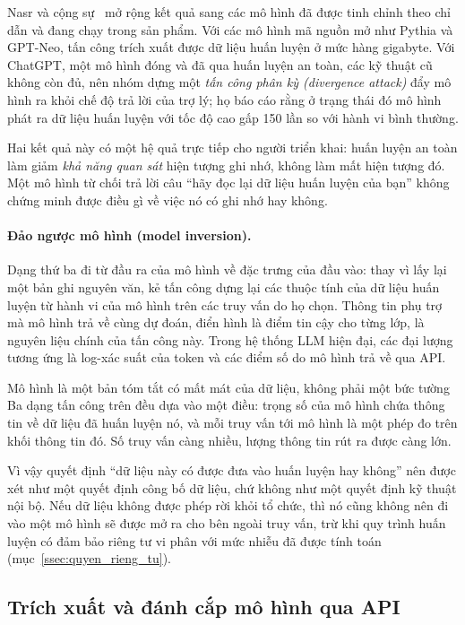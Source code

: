 Nasr và cộng sự~\cite{nasr2023scalable} mở rộng kết quả sang các mô hình đã được tinh chỉnh theo chỉ dẫn và đang chạy trong sản phẩm. Với các mô hình mã nguồn mở như Pythia và GPT-Neo, tấn công trích xuất được dữ liệu huấn luyện ở mức hàng gigabyte. Với ChatGPT, một mô hình đóng và đã qua huấn luyện an toàn, các kỹ thuật cũ không còn đủ, nên nhóm dựng một \emph{tấn công phân kỳ (divergence attack)} đẩy mô hình ra khỏi chế độ trả lời của trợ lý; họ báo cáo rằng ở trạng thái đó mô hình phát ra dữ liệu huấn luyện với tốc độ cao gấp 150 lần so với hành vi bình thường.

Hai kết quả này có một hệ quả trực tiếp cho người triển khai: huấn luyện an toàn làm giảm \emph{khả năng quan sát} hiện tượng ghi nhớ, không làm mất hiện tượng đó. Một mô hình từ chối trả lời câu ``hãy đọc lại dữ liệu huấn luyện của bạn'' không chứng minh được điều gì về việc nó có ghi nhớ hay không.

\paragraph{Đảo ngược mô hình (model inversion).} Dạng thứ ba đi từ đầu ra của mô hình về đặc trưng của đầu vào: thay vì lấy lại một bản ghi nguyên văn, kẻ tấn công dựng lại các thuộc tính của dữ liệu huấn luyện từ hành vi của mô hình trên các truy vấn do họ chọn. Thông tin phụ trợ mà mô hình trả về cùng dự đoán, điển hình là điểm tin cậy cho từng lớp, là nguyên liệu chính của tấn công này. Trong hệ thống LLM hiện đại, các đại lượng tương ứng là log-xác suất của token và các điểm số do mô hình trả về qua API.

\begin{keyidea}{Mô hình là một bản tóm tắt có mất mát của dữ liệu, không phải một bức tường}
Ba dạng tấn công trên đều dựa vào một điều: trọng số của mô hình chứa thông tin về dữ liệu đã huấn luyện nó, và mỗi truy vấn tới mô hình là một phép đo trên khối thông tin đó. Số truy vấn càng nhiều, lượng thông tin rút ra được càng lớn.

Vì vậy quyết định ``dữ liệu này có được đưa vào huấn luyện hay không'' nên được xét như một quyết định công bố dữ liệu, chứ không như một quyết định kỹ thuật nội bộ. Nếu dữ liệu không được phép rời khỏi tổ chức, thì nó cũng không nên đi vào một mô hình sẽ được mở ra cho bên ngoài truy vấn, trừ khi quy trình huấn luyện có đảm bảo riêng tư vi phân với mức nhiễu đã được tính toán (mục~\ref{ssec:quyen_rieng_tu}).
\end{keyidea}

\subsection{Trích xuất và đánh cắp mô hình qua API}
\label{ssec:model_extraction}

